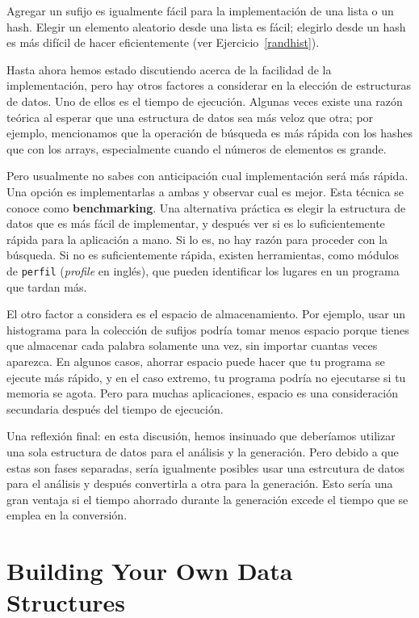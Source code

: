 Agregar un sufijo es igualmente fácil para la implementación de una lista
o un hash. Elegir un elemento aleatorio desde una lista es fácil; elegirlo
desde un hash es más difícil de hacer eficientemente (ver Ejercicio~\ref{randhist}).

Hasta ahora hemos estado discutiendo acerca de la facilidad de la implementación,
pero hay otros factores a considerar en la elección de estructuras de datos.
Uno de ellos es el tiempo de ejecución. Algunas veces existe una razón teórica 
al esperar que una estructura de datos sea más veloz que otra; por ejemplo,
mencionamos que la operación de búsqueda es más rápida con los hashes que con los
arrays, especialmente cuando el números de elementos es grande.

Pero usualmente no sabes con anticipación cual implementación será más rápida.
Una opción es implementarlas a ambas y observar cual es mejor. Esta técnica se
conoce como {\bf benchmarking}. Una alternativa práctica es elegir la estructura 
de datos que es más fácil de implementar, y después ver si es lo suficientemente
rápida para la aplicación a mano. Si lo es, no hay razón para proceder con
la búsqueda. Si no es suficientemente rápida, existen herramientas, como módulos
de {\tt perfil} (\emph{profile} en inglés), que pueden identificar los lugares
en un programa que tardan más.

El otro factor a considera es el espacio de almacenamiento. Por ejemplo,  
usar un histograma para la colección de sufijos podría tomar menos espacio
porque tienes que almacenar cada palabra solamente una vez, sin importar 
cuantas veces aparezca. En algunos casos, ahorrar espacio puede hacer
que tu programa se ejecute más rápido, y en el caso extremo, tu programa
podría no ejecutarse si tu memoria se agota. Pero para muchas aplicaciones,
espacio es una consideración secundaria después del tiempo de ejecución.

Una reflexión final: en esta discusión, hemos insinuado que deberíamos utilizar
una sola estructura de datos para el análisis y la generación. Pero debido a que
estas son fases separadas, sería igualmente posibles usar una estrcutura de datos
para el análisis y después convertirla a otra para la generación. Esto sería
una gran ventaja si el tiempo ahorrado durante la generación excede el tiempo
que se emplea en la conversión.

\section{Building Your Own Data Structures}

